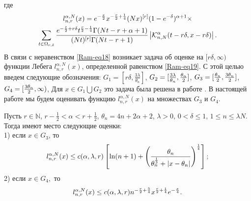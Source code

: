 где
\begin{multline}\label{Ram-eq19}
l_{n,r}^{\alpha,N}(x)=e^{-{x\over 2}}x^{-{r\over 2}+{1\over 4}}(Nx)^{[r]}(1-e^{-\delta})^{\alpha+1}\times\\
\sum_{t\in\Omega_{r,\delta}}{e^{-{t\over 2}+r\delta}t^{{r\over 2}-{1\over 4}}\Gamma(Nt-r+\alpha+1)\over(Nt)^{[r]}\Gamma(Nt-r+1)}
\left|\mathcal{K}_{n,N}^\alpha(t-r\delta,x-r\delta)\right|.
\end{multline}
В связи с неравенством \eqref{Ram-eq18} возникает задача об оценке на $[r\delta, \infty)$ функции Лебега $l_{n,r}^{\alpha,N}(x)$, определенной равенством \eqref{Ram-eq19}. С этой целью введем следующие обозначения:
$G_1=[r\delta,\frac{3\lambda}{\theta_n}]$, $G_2=[\frac{3\lambda}{\theta_n},{\theta_n\over 2}]$,
$G_3=[\frac{\theta_n}{2},{3\theta_n\over 2}]$,
$G_4=[{3\theta_n\over 2}, \infty)$,
Для $x\in G_1\bigcup G_2$ это задача была решена в работе \cite{RamVMJ}.
В настоящей работе мы будем оценивать функцию $l_{n,r}^{\alpha,N}(x)$ на множествах $G_3$ и $G_4$.

\begin{theorem}\label{Ramtheo2}
Пусть $r\in\mathbb{N}$, $r-\frac{1}{2}<\alpha< r+\frac{1}{2}$, $\theta_n=4n+2\alpha+2$, $\lambda>0$, $0<\delta\leq1$, $1\leq n\leq\lambda N.$ Тогда имеют место следующие оценки:\\
1) если $x\in G_3$, то
\begin{equation*}
l_{n,r}^{\alpha,N}(x)\leq c(\alpha,\lambda,r)\left[\ln(n+1)+
\left(\frac{\theta_n}{\theta_n^{1\over3}+|x-\theta_n|}
\right)^{\frac{1}{4}}\right];
\end{equation*}
2) если $x\in G_4,$ то
\begin{equation*}
l_{n,r}^{\alpha,N}(x)\leq c(\alpha,\lambda,r)n^{-{r\over 2}+{5\over 4}}
x^{{r\over 2}+{1\over 4}}e^{-\frac{x}{4}}.
\end{equation*}
\end{theorem}
